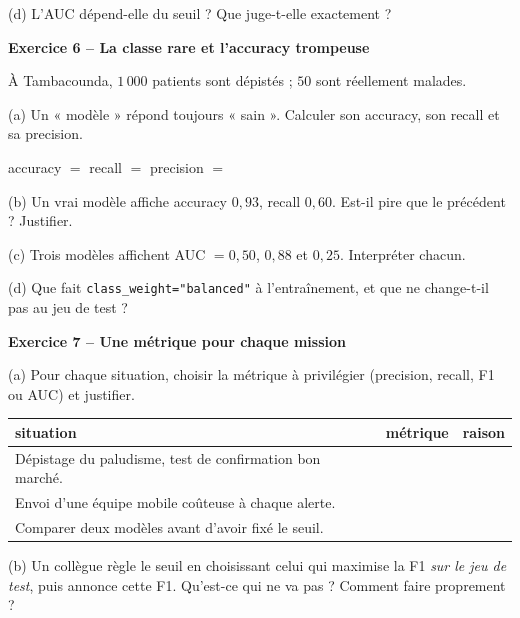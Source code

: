\documentclass[10pt,a4paper]{article}
\newcommand{\repligne}{\par\vspace{0.42cm}\noindent\dotfill}
\newcommand{\zonecalcul}[1]{\par\vspace{0.15cm}\noindent{\small\emph{Espace de calcul :}}\par\vspace{#1}}
\begin{document}
\vspace{0.15cm}
(d) L'AUC dépend-elle du seuil ? Que juge-t-elle exactement ?
\repligne

\vspace{0.45cm}
\textbf{\large Exercice 6 -- La classe rare et l'accuracy trompeuse}
\vspace{0.15cm}

À Tambacounda, $1\,000$ patients sont dépistés ; $50$ sont réellement malades.

\vspace{0.15cm}
(a) Un « modèle » répond toujours « sain ». Calculer son accuracy, son recall et sa precision.
\zonecalcul{0.8cm}
accuracy $=$ \makebox[2cm]{\dotfill} \quad recall $=$ \makebox[2cm]{\dotfill} \quad precision $=$ \makebox[2.5cm]{\dotfill}

\vspace{0.15cm}
(b) Un vrai modèle affiche accuracy $0{,}93$, recall $0{,}60$. Est-il pire que le précédent ? Justifier.
\repligne\repligne

\vspace{0.15cm}
(c) Trois modèles affichent AUC $=0{,}50$, $0{,}88$ et $0{,}25$. Interpréter chacun.
\repligne\repligne

\vspace{0.15cm}
(d) Que fait \texttt{class\_weight="balanced"} à l'entraînement, et que ne change-t-il pas au jeu de test ?
\repligne

\vspace{0.45cm}
\textbf{\large Exercice 7 -- Une métrique pour chaque mission}
\vspace{0.15cm}

(a) Pour chaque situation, choisir la métrique à privilégier (precision, recall, F1 ou AUC) et justifier.

\vspace{0.1cm}
{\small \renewcommand{\arraystretch}{1.9}\begin{tabular}{|p{9.5cm}|c|p{3.6cm}|}\hline
situation & métrique & raison\\\hline
Dépistage du paludisme, test de confirmation bon marché. & & \\\hline
Envoi d'une équipe mobile coûteuse à chaque alerte. & & \\\hline
Comparer deux modèles avant d'avoir fixé le seuil. & & \\\hline
\end{tabular}}

\vspace{0.2cm}
(b) Un collègue règle le seuil en choisissant celui qui maximise la F1 \emph{sur le jeu de test}, puis annonce cette F1. Qu'est-ce qui ne va pas ? Comment faire proprement ?
\repligne\repligne\repligne
\end{document}
